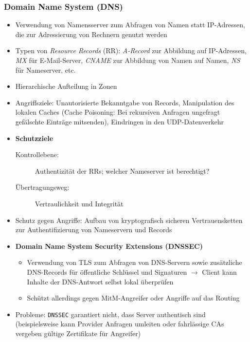 \subsubsection{Domain Name System (DNS)}
\begin{itemize}
	\item Verwendung von Namensserver zum Abfragen von Namen statt IP-Adressen, die zur Adressierung von Rechnern genutzt werden
	\item Typen von \textit{Resource Records} (RR): \textit{A-Record} zur Abbildung auf IP-Adressen, \textit{MX} für E-Mail-Server, \textit{CNAME} zur Abbildung von Namen auf Namen, \textit{NS} für Nameserver, etc.
	\item Hierarchische Aufteilung in Zonen
	\item Angriffsziele: Unautorisierte Bekanntgabe von Records, Manipulation des lokalen Caches (Cache Poisoning: Bei rekursiven Anfragen ungefragt gefälschte Einträge mitsenden), Eindringen in den UDP-Datenverkehr
	\item \textbf{Schutzziele}
	\begin{description}
		\item[Kontrollebene:] Authentizität der RRs; welcher Nameserver ist berechtigt?
		\item[Übertragungsweg:] Vertraulichkeit und Integrität
	\end{description}
	\item Schutz gegen Angriffe: Aufbau von kryptografisch sicheren Vertrauensketten zur Authentifizierung von Nameservern und Records
	\item \textbf{Domain Name System Security Extensions (DNSSEC)}
	\begin{itemize}
		\item Verwendung von TLS zum Abfragen von DNS-Servern sowie zusätzliche DNS-Records für öffentliche Schlüssel und Signaturen \(\rightarrow\) Client kann Inhalte der DNS-Antwort selbst lokal überprüfen
		\item Schützt allerdings gegen MitM-Angreifer oder Angriffe auf das Routing
	\end{itemize}
	\item Probleme: \texttt{DNSSEC} garantiert nicht, dass Server authentisch sind (beispielsweise kann Provider Anfragen umleiten oder fahrlässige CAs vergeben gültige Zertifikate für Angreifer)
\end{itemize}

